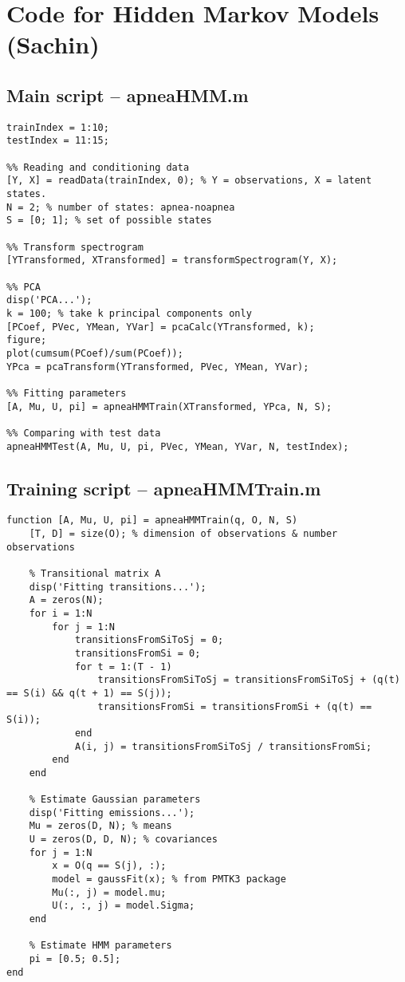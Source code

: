 \chapter{Code for Hidden Markov Models (Sachin)}
\label{ch:HMMCode}

\section{Main script -- apneaHMM.m}
\label{sec:apneaHMM}
\begin{lstlisting}
trainIndex = 1:10;
testIndex = 11:15;

%% Reading and conditioning data
[Y, X] = readData(trainIndex, 0); % Y = observations, X = latent states.
N = 2; % number of states: apnea-noapnea
S = [0; 1]; % set of possible states

%% Transform spectrogram
[YTransformed, XTransformed] = transformSpectrogram(Y, X);

%% PCA
disp('PCA...');
k = 100; % take k principal components only
[PCoef, PVec, YMean, YVar] = pcaCalc(YTransformed, k);
figure;
plot(cumsum(PCoef)/sum(PCoef));
YPca = pcaTransform(YTransformed, PVec, YMean, YVar);

%% Fitting parameters
[A, Mu, U, pi] = apneaHMMTrain(XTransformed, YPca, N, S);

%% Comparing with test data
apneaHMMTest(A, Mu, U, pi, PVec, YMean, YVar, N, testIndex);
\end{lstlisting}

\section{Training script -- apneaHMMTrain.m}
\label{sec:apneaHMMTrain}
\begin{lstlisting}
function [A, Mu, U, pi] = apneaHMMTrain(q, O, N, S)
    [T, D] = size(O); % dimension of observations & number observations

    % Transitional matrix A
    disp('Fitting transitions...');
    A = zeros(N);
    for i = 1:N
        for j = 1:N
            transitionsFromSiToSj = 0;
            transitionsFromSi = 0;
            for t = 1:(T - 1)
                transitionsFromSiToSj = transitionsFromSiToSj + (q(t) == S(i) && q(t + 1) == S(j));
                transitionsFromSi = transitionsFromSi + (q(t) == S(i));
            end
            A(i, j) = transitionsFromSiToSj / transitionsFromSi;
        end
    end

    % Estimate Gaussian parameters
    disp('Fitting emissions...');
    Mu = zeros(D, N); % means
    U = zeros(D, D, N); % covariances
    for j = 1:N
        x = O(q == S(j), :);
        model = gaussFit(x); % from PMTK3 package
        Mu(:, j) = model.mu;
        U(:, :, j) = model.Sigma;
    end

    % Estimate HMM parameters
    pi = [0.5; 0.5];
end
\end{lstlisting}


